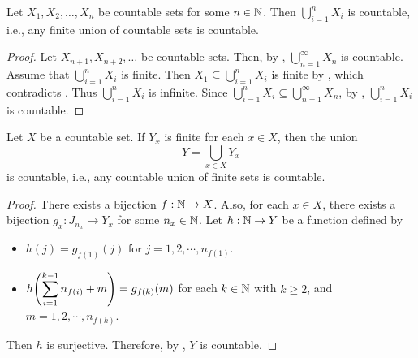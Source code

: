 \bigskip

\begin{corollary} \label{cor:FiniteUnionOfCountableSetsIsCountable}
    Let $X_{1}, X_{2}, \dots, X_{n}$ be countable sets for some $n \in \mathbb{N}$. Then $\displaystyle
    \bigcup_{i = 1}^{n} X_{i}$ is countable, i.e., any finite union of countable sets is countable.
\end{corollary}

\begin{proof}
    Let $X_{n + 1}, X_{n + 2}, \dots$ be countable sets. Then, by ,
    $\displaystyle \bigcup_{n = 1}^{\infty} X_{n}$ is countable. Assume that $\displaystyle \bigcup_{i = 1}^{n} X_{i}$
    is finite. Then $\displaystyle X_{1} \subseteq \bigcup_{i = 1}^{n} X_{i}$ is finite by
    , which contradicts . Thus
    $\displaystyle \bigcup_{i = 1}^{n} X_{i}$ is infinite. Since $\displaystyle \bigcup_{i = 1}^{n} X_{i}
    \subseteq \bigcup_{n = 1}^{\infty} X_{n}$, by ,
    $\displaystyle \bigcup_{i = 1}^{n} X_{i}$ is countable. 
\end{proof}

\bigskip

\begin{theorem} \label{thm:CountableUnionOfFiniteSetsIsCountable}
    Let $X$ be a countable set. If $Y_x$ is finite for each $x \in X$, then the union
    \[
    Y = \bigcup_{x \in X} Y_x
    \]
    is countable, i.e., any countable union of finite sets is countable.
\end{theorem}

\begin{proof}
    There exists a bijection $f: \mathbb{N} \to X$. Also, for each $x \in X$, there exists a bijection
    $g_{x}: J_{n_{x}} \to Y_x$ for some $n_{x} \in \mathbb{N}$. Let $h: \mathbb{N} \to Y$ be a function defined by
    \begin{itemize}
        \item $h(j) = g_{f(1)}(j)$ for $j = 1, 2, \cdots, n_{f(1)}$.
        \item $h\displaystyle \paren*{\sum_{i = 1}^{k - 1} n_{f(i)} + m} =
        g_{f(k)}(m)$ for each $k \in \mathbb{N}$ with $k \geq 2$, and $m = 1, 2, \cdots, n_{f(k)}$.
    \end{itemize}
    Then $h$ is surjective. Therefore, by , $Y$ is countable.
\end{proof}

